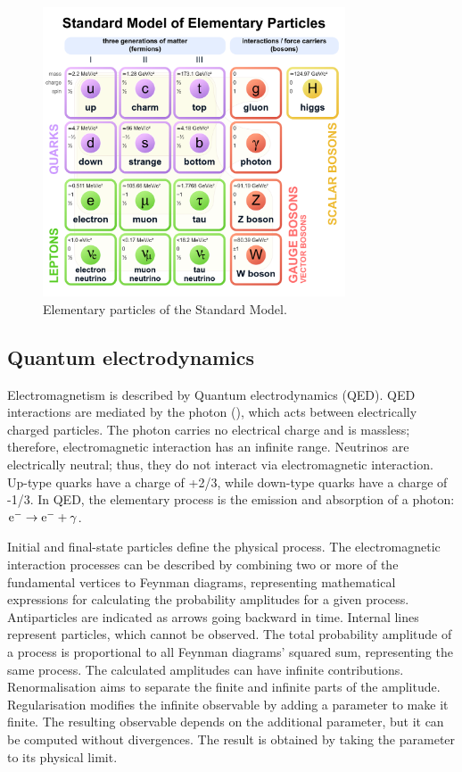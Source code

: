 \begin{figure}[htbp]
  \centering
  \includegraphics[width=0.8\textwidth]{plots/chapter2/sm_particles.png}
  \caption{Elementary particles of the Standard Model.}
  \label{fig:sm_particles}
\end{figure}

\subsection{Quantum electrodynamics}

Electromagnetism is described by Quantum electrodynamics (QED). QED interactions are mediated by the photon (\Pgg), which acts between electrically charged particles. The photon carries no electrical charge and is massless; therefore, electromagnetic interaction has an infinite range. Neutrinos are electrically neutral; thus, they do not interact via electromagnetic interaction. Up-type quarks have a charge of +2/3, while down-type quarks have a charge of -1/3. In QED, the elementary process is the emission and absorption of a photon: $\text{e}^{-} \to \text{e}^{-}+\gamma$.

Initial and final-state particles define the physical process. The electromagnetic interaction processes can be described by combining two or more of the fundamental vertices to Feynman diagrams, representing mathematical expressions for calculating the probability amplitudes for a given process. Antiparticles are indicated as arrows going backward in time. Internal lines represent particles, which cannot be observed. The total probability amplitude of a process is proportional to all Feynman diagrams' squared sum, representing the same process. The calculated amplitudes can have infinite contributions. Renormalisation aims to separate the finite and infinite parts of the amplitude. Regularisation modifies the infinite observable by adding a parameter to make it finite. The resulting observable depends on the additional parameter, but it can be computed without divergences. The result is obtained by taking the parameter to its physical limit.

